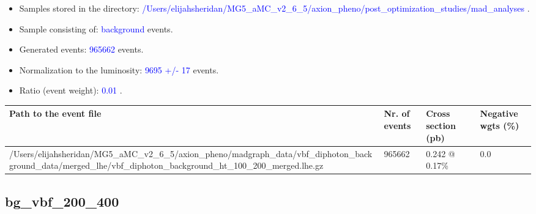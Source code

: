 \documentclass[a4paper, 10pt]{article}
\begin{document}
\begin{itemize}
  \item Samples stored in the directory: \textcolor{blue}{/\-Users/\-elijahsheridan/\-MG5\_aMC\_v2\_6\_5/\-axion\_pheno/\-post\_optimization\_studies/\-mad\_analyses} .
   \item Sample consisting of: \textcolor{blue}{background}  events.
   \item Generated events: \textcolor{blue}{965662 }  events.
   \item Normalization to the luminosity: \textcolor{blue}{9695}\textcolor{blue}{ +/\-- }\textcolor{blue}{17 }  events.
   \item Ratio (event weight): \textcolor{blue}{0.01 } .  
 
\end{itemize}
\begin{table}[H]
  \begin{center}
    \begin{tabular}{|m{55.0mm}|m{25.0mm}|m{30.0mm}|m{30.0mm}|}
      \hline
      {\cellcolor{yellow}         Path to the event file}& {\cellcolor{yellow}         Nr. of events}& {\cellcolor{yellow}         Cross section (pb)}& {\cellcolor{yellow}         Negative wgts (\%)}\\
      \hline
      {\cellcolor{white}          /\-Users/\-elijahsheridan/\-MG5\_aMC\_v2\_6\_5/\-axion\_pheno/\-madgraph\_data/\-vbf\_diphoton\_background\_data/\-merged\_lhe/\-vbf\_diphoton\_background\_ht\_100\_200\_merged.lhe.gz}& {\cellcolor{white}          965662}& {\cellcolor{white}          0.242 @ 0.17\%}& {\cellcolor{white}          0.0}\\
\hline
    \end{tabular}
  \end{center}
\end{table}

\subsection{ bg\_vbf\_200\_400}
\end{document}

